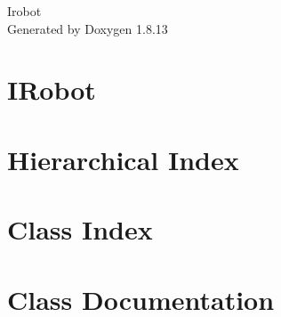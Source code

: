 \documentclass[twoside]{book}
\newcommand{\+}{\discretionary{\mbox{\scriptsize$\hookleftarrow$}}{}{}}
\newcommand{\clearemptydoublepage}{%
  \newpage{\pagestyle{empty}\cleardoublepage}%
}
\begin{document}
\begin{titlepage}
\vspace*{7cm}
\begin{center}%
{\Large Irobot }\\
\vspace*{1cm}
{\large Generated by Doxygen 1.8.13}\\
\end{center}
\end{titlepage}
\clearemptydoublepage
{}
\tableofcontents
\clearemptydoublepage
{}

\chapter{I\+Robot}
\label{md__r_e_a_d_m_e}

\chapter{Hierarchical Index}

\chapter{Class Index}

\chapter{Class Documentation}
























































\backmatter
\newpage
{}
\clearemptydoublepage
{}
\printindex
\end{document}
